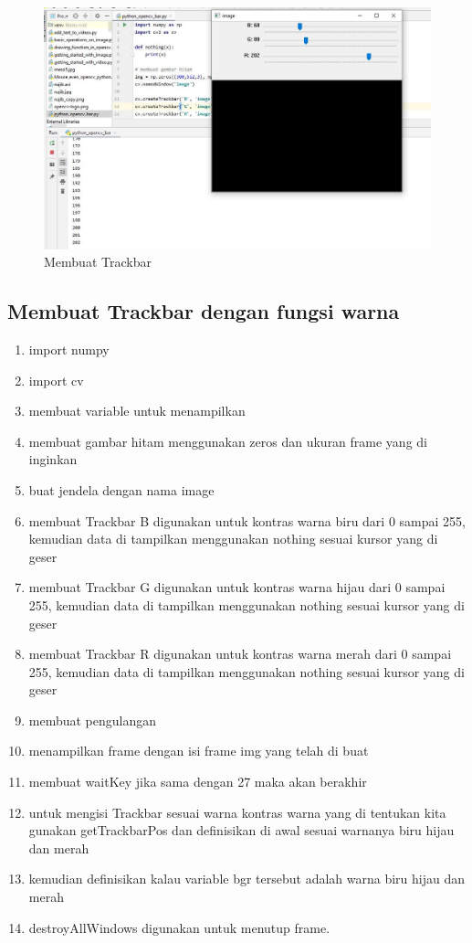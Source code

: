 \newpage
\begin{figure}[ht]
\centering
\includegraphics[scale=0.45]{figures/2,30,1.jpg}
\caption{Membuat Trackbar}
\label{contoh}
\end{figure}



\newpage
\subsection{Membuat Trackbar dengan fungsi warna}

\begin{enumerate}
	\item import numpy
	\item import cv
	\item membuat variable untuk menampilkan
	\item membuat gambar hitam menggunakan zeros dan ukuran frame yang di inginkan
	\item buat jendela dengan nama image
	\item membuat Trackbar B digunakan untuk kontras warna biru dari 0 sampai 255, kemudian data di tampilkan menggunakan nothing sesuai kursor yang di geser
	\item membuat Trackbar G digunakan untuk kontras warna hijau dari 0 sampai 255, kemudian data di tampilkan menggunakan nothing sesuai kursor yang di geser
	\item membuat Trackbar R digunakan untuk kontras warna merah dari 0 sampai 255, kemudian data di tampilkan menggunakan nothing sesuai kursor yang di geser
	\item membuat pengulangan 
	\item menampilkan frame dengan isi frame img yang telah di buat
	\item membuat waitKey jika sama dengan 27 maka akan berakhir
	\item untuk mengisi Trackbar sesuai warna kontras warna yang di tentukan kita gunakan getTrackbarPos dan definisikan di awal sesuai warnanya biru hijau dan merah 
	\item kemudian definisikan kalau variable bgr tersebut adalah warna biru hijau dan merah
	\item destroyAllWindows digunakan untuk menutup frame.
\end{enumerate}

